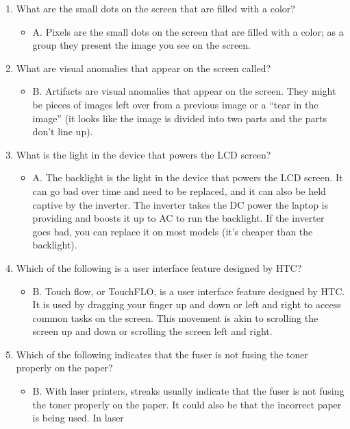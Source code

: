 \documentclass{article}
\begin{document}
\begin{enumerate}
\begin{itemize}
    \end{itemize}
    \item What are the small dots on the screen that are filled with a color?
    \begin{itemize}
        \item A. Pixels are the small dots on the screen that are filled with a color; as a group they
present the image you see on the screen.
    \end{itemize}
    \item What are visual anomalies that appear on the screen called? 
    \begin{itemize}
        \item B. Artifacts are visual anomalies that appear on the screen. They might be pieces of images
left over from a previous image or a “tear in the image” (it looks like the image is divided
into two parts and the parts don’t line up).
    \end{itemize}
    \item What is the light in the device that powers the LCD screen?
    \begin{itemize}
        \item A. The backlight is the light in the device that powers the LCD screen. It can go bad over
time and need to be replaced, and it can also be held captive by the inverter. The inverter
takes the DC power the laptop is providing and boosts it up to AC to run the backlight. If
the inverter goes bad, you can replace it on most models (it’s cheaper than the backlight).
    \end{itemize}
    \item Which of the following is a user interface feature designed by HTC?
    \begin{itemize}
        \item B. Touch flow, or TouchFLO, is a user interface feature designed by HTC. It is used by
dragging your finger up and down or left and right to access common tasks on the screen. This
movement is akin to scrolling the screen up and down or scrolling the screen left and right.
    \end{itemize}
    \item Which of the following indicates that the fuser is not fusing the toner properly on the
paper?
    \begin{itemize}
        \item B. With laser printers, streaks usually indicate that the fuser is not fusing the toner
properly on the paper. It could also be that the incorrect paper is being used. In laser

\end{itemize}
\end{enumerate}
\end{document}
